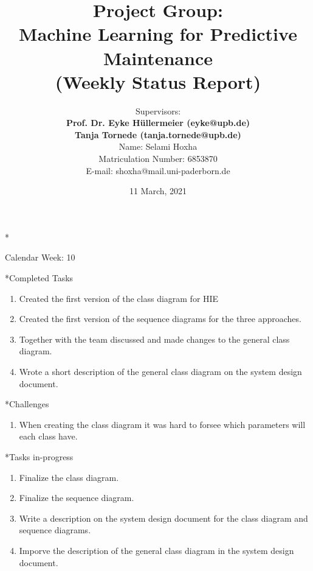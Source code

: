 \documentclass[11pt,a4paper]{article}
\title{Project Group:\\
\textbf{Machine Learning for Predictive Maintenance}\\
(Weekly Status Report)}
\author{Supervisors:\\
\textbf{Prof. Dr. Eyke H{\"u}llermeier (eyke@upb.de)}\\
\textbf{Tanja Tornede (tanja.tornede@upb.de)}\\ 
\vspace{10mm}
Name: Selami Hoxha \\
Matriculation Number: 6853870\\
E-mail: shoxha@mail.uni-paderborn.de
}
\date{}
\begin{document}
\maketitle
\thispagestyle{empty}

\clearpage
{}

\newpage
\begin{section}*{Calendar Week: 10 \hfill \date{11 March, 2021}}
 \begin{refsection}

       \begin{subsection}*{Completed Tasks}
             \begin{enumerate}
                   \item
                         Created the first version of the class diagram for HIE
                   \item
                         Created the first version of the sequence diagrams for the three approaches.
                   \item
                         Together with the team discussed and made changes to the general class diagram.
                   \item
                         Wrote a short description of the general class diagram on the system design document.
             \end{enumerate}
       \end{subsection}

       \begin{subsection}*{Challenges}
             \begin{enumerate}
                   \item
                         When creating the class diagram it was hard to forsee which parameters will each class have.
             \end{enumerate}
       \end{subsection}

       \begin{subsection}*{Tasks in-progress}
             \begin{enumerate}
                   \item
                         Finalize the class diagram.
                   \item
                         Finalize the sequence diagram.
                   \item
                         Write a description on the system design document for the class diagram and sequence diagrams.
                   \item
                         Imporve the description of the general class diagram in the system design document.

             \end{enumerate}
       \end{subsection}
 \end{refsection}
\end{section}
\end{document}
